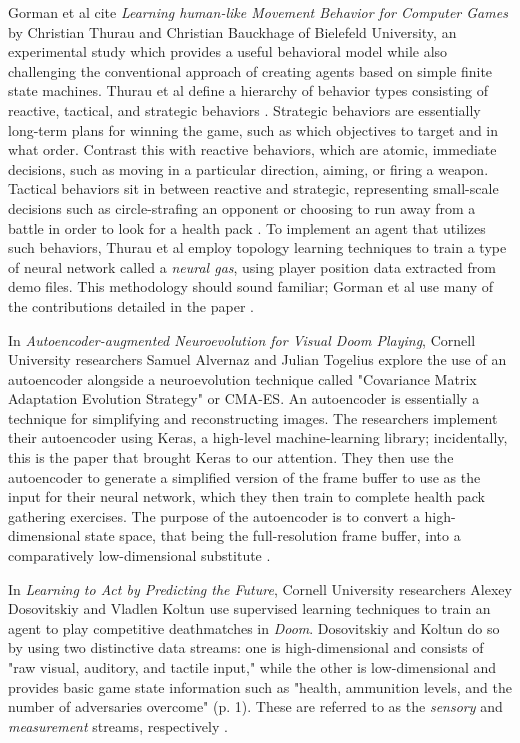 Gorman et al cite {\it Learning human-like Movement Behavior for Computer Games} by Christian Thurau and Christian Bauckhage of Bielefeld University, an experimental study which provides a useful behavioral model while also challenging the conventional approach of creating agents based on simple finite state machines. Thurau et al define a hierarchy of behavior types consisting of reactive, tactical, and strategic behaviors \cite{Thurau:2004}. Strategic behaviors are essentially long-term plans for winning the game, such as which objectives to target and in what order. Contrast this with reactive behaviors, which are atomic, immediate decisions, such as moving in a particular direction, aiming, or firing a weapon. Tactical behaviors sit in between reactive and strategic, representing small-scale decisions such as circle-strafing an opponent or choosing to run away from a battle in order to look for a health pack \cite{Gorman:2006}. To implement an agent that utilizes such behaviors, Thurau et al employ topology learning techniques to train a type of neural network called a {\it neural gas}, using player position data extracted from demo files. This methodology should sound familiar; Gorman et al use many of the contributions detailed in the paper \cite{Thurau:2004}.

In {\it Autoencoder-augmented Neuroevolution for Visual Doom Playing}, Cornell University researchers Samuel Alvernaz and Julian Togelius explore the use of an autoencoder alongside a neuroevolution technique called "Covariance Matrix Adaptation Evolution Strategy" or CMA-ES. An autoencoder is essentially a technique for simplifying and reconstructing images. The researchers implement their autoencoder using Keras, a high-level machine-learning library; incidentally, this is the paper that brought Keras to our attention. They then use the autoencoder to generate a simplified version of the frame buffer to use as the input for their neural network, which they then train to complete health pack gathering exercises. The purpose of the autoencoder is to convert a high-dimensional state space, that being the full-resolution frame buffer, into a comparatively low-dimensional substitute \cite{Alvernaz:2017}.

In {\it Learning to Act by Predicting the Future}, Cornell University researchers Alexey Dosovitskiy and Vladlen Koltun use supervised learning techniques to train an agent to play competitive deathmatches in {\it Doom}. Dosovitskiy and Koltun do so by using two distinctive data streams: one is high-dimensional and consists of "raw visual, auditory, and tactile input," while the other is low-dimensional and provides basic game state information such as "health, ammunition levels, and the number of adversaries overcome" (p. 1). These are referred to as the {\it sensory} and {\it measurement} streams, respectively \cite{Dosovitskiy:2016}.

